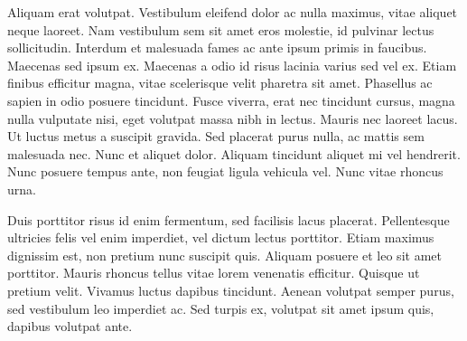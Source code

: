 \documentclass[twocolumn]{article}
\begin{document}
	Aliquam erat volutpat. Vestibulum eleifend dolor ac nulla maximus, vitae aliquet neque laoreet. Nam vestibulum sem sit amet eros molestie, id pulvinar lectus sollicitudin. Interdum et malesuada fames ac ante ipsum primis in faucibus. Maecenas sed ipsum ex. Maecenas a odio id risus lacinia varius sed vel ex. Etiam finibus efficitur magna, vitae scelerisque velit pharetra sit amet. Phasellus ac sapien in odio posuere tincidunt. Fusce viverra, erat nec tincidunt cursus, magna nulla vulputate nisi, eget volutpat massa nibh in lectus. Mauris nec laoreet lacus. Ut luctus metus a suscipit gravida. Sed placerat purus nulla, ac mattis sem malesuada nec. Nunc et aliquet dolor. Aliquam tincidunt aliquet mi vel hendrerit. Nunc posuere tempus ante, non feugiat ligula vehicula vel. Nunc vitae rhoncus urna.
	
	Duis porttitor risus id enim fermentum, sed facilisis lacus placerat. Pellentesque ultricies felis vel enim imperdiet, vel dictum lectus porttitor. Etiam maximus dignissim est, non pretium nunc suscipit quis. Aliquam posuere et leo sit amet porttitor. Mauris rhoncus tellus vitae lorem venenatis efficitur. Quisque ut pretium velit. Vivamus luctus dapibus tincidunt. Aenean volutpat semper purus, sed vestibulum leo imperdiet ac. Sed turpis ex, volutpat sit amet ipsum quis, dapibus volutpat ante.
	
\end{document}
